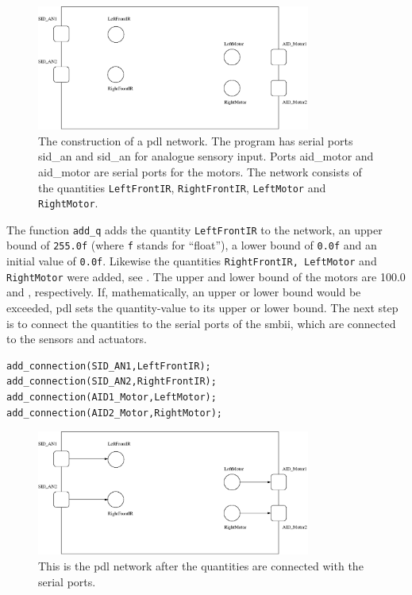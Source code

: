 \begin{figure}
\centerline{\includegraphics[width=9cm]{robots//pdl_networka.eps}}
\caption{The construction of a {\sc pdl} network. The program has serial ports \mbox{{\sc sid\_an{}}} and {\sc sid\_an{}} for analogue sensory input. Ports {\sc aid\_motor{}} and {\sc aid\_motor{}} are serial ports for the motors. The network consists of the quantities \texttt{LeftFrontIR}, \texttt{RightFrontIR}, \texttt{LeftMotor} and \texttt{RightMotor}.}
\label{f:robots:pdl_networka}
\end{figure}
\noindent
The function \texttt{add\_q} adds the quantity \texttt{LeftFrontIR} to the network, an upper bound of \texttt{255.0f} (where \texttt{f} stands for ``float''), a lower bound of \texttt{0.0f} and an initial value of \texttt{0.0f}. Likewise the quantities \texttt{RightFrontIR, LeftMotor} and \texttt{RightMotor} were added, see . The upper and lower bound of the motors are 100.0 and , respectively. If, mathematically, an upper or lower bound would be exceeded, {\sc pdl} sets the quantity-value to its upper or lower bound. The next step is to connect the quantities to the serial ports of the {\sc smbii}, which are connected to the sensors and actuators.


\begin{lstlisting}
add_connection(SID_AN1,LeftFrontIR);
add_connection(SID_AN2,RightFrontIR);
add_connection(AID1_Motor,LeftMotor);
add_connection(AID2_Motor,RightMotor);
\end{lstlisting}

\begin{figure}
\centerline{\includegraphics[width=9cm]{robots//pdl_networkb.eps}}
\caption{This is the {\sc pdl} network after the quantities are connected with the serial ports.}
\label{f:robots:pdl_networkb}
\end{figure}

